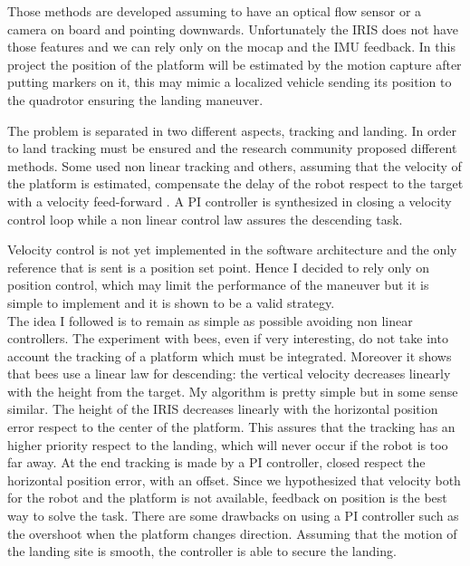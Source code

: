 \noindent
Those methods are developed assuming to have an optical flow sensor or a camera on board and pointing downwards. Unfortunately the IRIS does not have those features and we can rely only on the mocap and the IMU feedback. 
In this project the position of the platform will be estimated by the motion capture after putting markers on it, this may mimic a localized vehicle sending its position to the quadrotor ensuring the landing maneuver. \par The problem is separated in two different aspects, tracking and landing. In order to land tracking must be ensured and the research community proposed different methods. Some used non linear tracking \cite{Holger2008} and others, assuming that the velocity of the platform is estimated, compensate the delay of the robot respect to the target with a velocity feed-forward \cite{Friis2009}. A PI controller is synthesized in \cite{Herisse2010} closing a velocity control loop while a non linear control law assures the descending task. \par
Velocity control is not yet implemented in the software architecture and the only reference that is sent is a position set point. Hence I decided to rely only on position control, which may limit the performance of the maneuver but it is simple to implement and it is shown to be a valid strategy. \\
\noindent
The idea I followed is to remain as simple as possible avoiding non linear controllers. The experiment with bees, even if very interesting, do not take into account the tracking of a platform which must be integrated. Moreover it shows that bees use a linear law for descending: the vertical velocity decreases linearly with the height from the target. My algorithm is pretty simple but in some sense similar. The height of the IRIS decreases linearly with the horizontal position error respect to the center of the platform. This assures that the tracking has an higher priority respect to the landing, which will never occur if the robot is too far away. At the end tracking is made by a PI controller, closed respect the horizontal position error, with an offset. Since we hypothesized that velocity both for the robot and the platform is not available, feedback on position is the best way to solve the task. There are some drawbacks on using a PI controller such as the overshoot when the platform changes direction. Assuming that the motion of the landing site is smooth, the controller is able to secure the landing. 




























